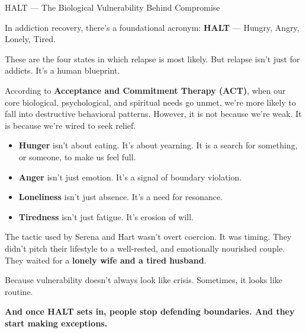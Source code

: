 \begin{TechnicalSidebar}{HALT --- The Biological Vulnerability Behind Compromise}

  In addiction recovery, there’s a foundational acronym: \textbf{HALT} — Hungry, Angry, Lonely, Tired.

  \medskip
  
  These are the four states in which relapse is most likely.  
  But relapse isn’t just for addicts. It’s a human blueprint.
  
  \medskip
  
  According to \textbf{Acceptance and Commitment Therapy (ACT)}, when our core biological, psychological, 
  and spiritual needs go unmet, we’re 
  more likely to fall into destructive behavioral patterns. However, it is not because we’re weak. 
  It is because we’re wired to seek relief.  
  
  \medskip
 
  \begin{itemize}
    \item \textbf{Hunger} isn’t about eating. It’s about yearning.
  It is a search for something, or someone, to make us feel full.


    \item \textbf{Anger} isn’t just emotion. It’s a signal of boundary violation.  


    \item \textbf{Loneliness} isn’t just absence. It’s a need for resonance.  


    \item \textbf{Tiredness} isn’t just fatigue. It’s erosion of will.
  \end{itemize}
  
  \medskip
  
  The tactic used by Serena and Hart wasn’t overt coercion. It was timing.  
  They didn’t pitch their lifestyle to a well-rested, and emotionally nourished couple.  
  They waited for a \textbf{lonely wife and a tired husband}.

  \medskip
  
  Because vulnerability doesn’t always look like crisis.  
  Sometimes, it looks like routine.
  
  \medskip
  
  \textbf{And once HALT sets in, people stop defending boundaries. And they start making exceptions.}

\end{TechnicalSidebar}



